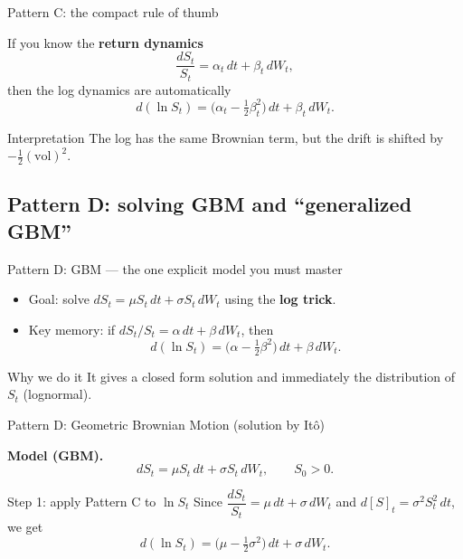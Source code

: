 \documentclass[10pt,aspectratio=169]{beamer}
\begin{document}
\begin{frame}{Pattern C: the compact rule of thumb}

If you know the \textbf{return dynamics}
\[
\frac{dS_t}{S_t}=\alpha_t\,dt+\beta_t\,dW_t,
\]
then the log dynamics are automatically\pause
\[
d(\ln S_t)=\Big(\alpha_t-\tfrac12\beta_t^2\Big)\,dt+\beta_t\,dW_t.
\]

\medskip
\begin{alertblock}{Interpretation}
The log has the same Brownian term, but the drift is shifted by
$-\frac12(\text{vol})^2$.
\end{alertblock}

\end{frame}
\subsection{Pattern D: solving GBM and ``generalized GBM''}

\begin{frame}{Pattern D: GBM — the one explicit model you must master}

\begin{itemize}
  \item Goal: solve $dS_t=\mu S_t\,dt+\sigma S_t\,dW_t$ using the \textbf{log trick}.\pause
  \item Key memory: if $dS_t/S_t=\alpha\,dt+\beta\,dW_t$, then
  \[
  d(\ln S_t)=\big(\alpha-\tfrac12\beta^2\big)\,dt+\beta\,dW_t.
  \]\pause
\end{itemize}

\begin{alertblock}{Why we do it}
It gives a closed form solution and immediately the distribution of $S_t$ (lognormal).
\end{alertblock}

\end{frame}

\begin{frame}{Pattern D: Geometric Brownian Motion (solution by It\^o)}

\textbf{Model (GBM).}\pause\;
\[
dS_t = \mu S_t\,dt + \sigma S_t\,dW_t,
\qquad S_0>0.
\]\pause

\begin{block}{Step 1: apply Pattern C to $\ln S_t$}
Since $\dfrac{dS_t}{S_t}=\mu\,dt+\sigma\,dW_t$ and $d[S]_t=\sigma^2 S_t^2\,dt$, we get\pause
\[
d(\ln S_t)
=
\Big(\mu-\tfrac12\sigma^2\Big)\,dt
+
\sigma\,dW_t.
\]
\end{block}

\end{frame}
\end{document}
